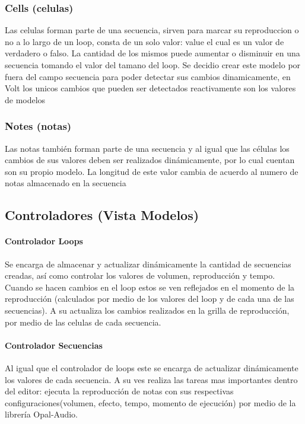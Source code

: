 \subsubsection{Cells (celulas)}
Las celulas forman parte de una secuencia, sirven para marcar su reproduccion o no
a lo largo de un loop, consta de un solo valor: value el cual es un valor de
verdadero o falso. La cantidad de los mismos puede aumentar o disminuir en una
secuencia tomando el valor del tamano del loop. Se decidio crear este modelo por
fuera del campo secuencia para poder detectar sus cambios dinamicamente, en Volt
los unicos cambios que pueden ser detectados reactivamente son los valores de modelos

\subsubsection{Notes (notas)}
Las notas también forman parte de una secuencia y al igual que las células
los cambios de sus valores deben ser realizados dinámicamente, por lo cual
cuentan son su propio modelo. La longitud de este valor cambia de acuerdo
al numero de notas almacenado en la secuencia

\subsection{Controladores (Vista Modelos)}
\paragraph{Controlador Loops}
Se encarga de almacenar y actualizar dinámicamente la cantidad de secuencias creadas,
así como controlar los valores de volumen, reproducción y tempo.
Cuando se hacen cambios en el loop estos se ven reflejados en el momento de la reproducción
(calculados por medio de los valores del loop y de cada una de las secuencias). A su
actualiza los cambios realizados en la grilla de reproducción, por medio de las celulas
de cada secuencia.

\paragraph{Controlador Secuencias}
Al igual que el controlador de loops este se encarga de actualizar dinámicamente los
valores de cada secuencia. A su ves realiza las tareas mas importantes dentro del editor:
ejecuta la reproducción de notas con sus respectivas configuraciones(volumen, efecto, tempo,
momento de ejecución) por medio de la librería Opal-Audio.

